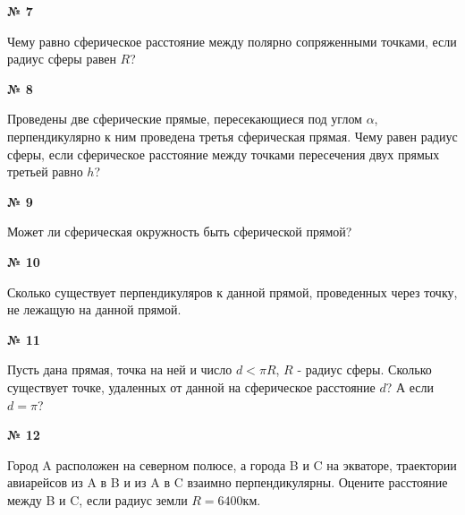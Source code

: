     \begin{center}
        \textbf{№ 7}
    \end{center}

    Чему равно сферическое расстояние между полярно сопряженными точками, если радиус сферы равен $R$?

    \begin{center}
        \textbf{№ 8}
    \end{center}

    Проведены две сферические прямые, пересекающиеся под углом $\alpha$,
    перпендикулярно к ним проведена третья сферическая прямая.
    Чему равен радиус сферы, если сферическое расстояние между точками пересечения
    двух прямых третьей равно $h$?

    \begin{center}
        \textbf{№ 9}
    \end{center}

    Может ли сферическая окружность быть сферической прямой?

    \begin{center}
        \textbf{№ 10}
    \end{center}

    Сколько существует перпендикуляров к данной прямой, проведенных через точку,
    не лежащую на данной прямой.

    \begin{center}
        \textbf{№ 11}
    \end{center}

    Пусть дана прямая, точка на ней и число $d < \pi R$, $R$ - радиус сферы.
    Сколько существует точке, удаленных от данной на сферическое расстояние $d$?
    А если $d = \pi$?

    \begin{center}
        \textbf{№ 12}
    \end{center}

    Город A расположен на северном полюсе, а города B и C на экваторе,
    траектории авиарейсов из A в B и из A в C взаимно перпендикулярны.
    Оцените расстояние между B и C, если радиус земли $R = 6400$км.

